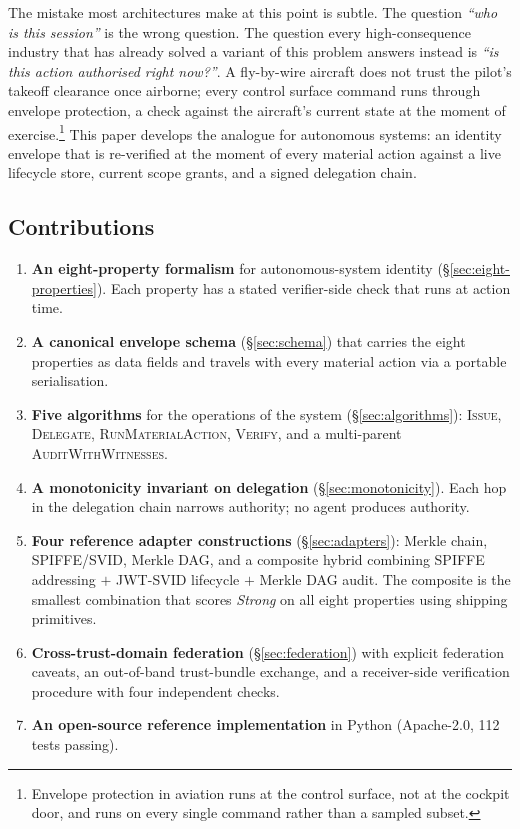 \documentclass[11pt,a4paper]{article}
\begin{document}
The mistake most architectures make at this point is subtle. The question
\emph{``who is this session''} is the wrong question. The question every
high-consequence industry that has already solved a variant of this
problem answers instead is \emph{``is this action authorised right now?''}.
A fly-by-wire aircraft does not trust the pilot's takeoff clearance once
airborne; every control surface command runs through envelope
protection, a check against the aircraft's current state at the moment of
exercise.\footnote{Envelope protection in aviation runs at the control
surface, not at the cockpit door, and runs on every single command rather
than a sampled subset.} This paper develops the analogue for autonomous
systems: an identity envelope that is re-verified at the moment of every
material action against a live lifecycle store, current scope grants,
and a signed delegation chain.

\subsection{Contributions}\label{sec:contributions}

\begin{enumerate}[leftmargin=*,label=\arabic*.]
  \item \textbf{An eight-property formalism} for autonomous-system
    identity (\S\ref{sec:eight-properties}). Each property has a stated
    verifier-side check that runs at action time.
  \item \textbf{A canonical envelope schema} (\S\ref{sec:schema}) that
    carries the eight properties as data fields and travels with every
    material action via a portable serialisation.
  \item \textbf{Five algorithms} for the operations of the system
    (\S\ref{sec:algorithms}): \textsc{Issue},
    \textsc{Delegate}, \textsc{RunMaterialAction}, \textsc{Verify}, and
    a multi-parent \textsc{AuditWithWitnesses}.
  \item \textbf{A monotonicity invariant on delegation}
    (\S\ref{sec:monotonicity}). Each hop in the delegation chain narrows
    authority; no agent produces authority.
  \item \textbf{Four reference adapter constructions} (\S\ref{sec:adapters}):
    Merkle chain, SPIFFE/SVID, Merkle DAG, and a composite hybrid
    combining SPIFFE addressing $+$ JWT-SVID lifecycle $+$ Merkle DAG
    audit. The composite is the smallest combination that scores
    \emph{Strong} on all eight properties using shipping primitives.
  \item \textbf{Cross-trust-domain federation} (\S\ref{sec:federation})
    with explicit federation caveats, an out-of-band trust-bundle
    exchange, and a receiver-side verification procedure with four
    independent checks.
  \item \textbf{An open-source reference implementation} in Python
    (Apache-2.0, 112 tests passing).
\end{enumerate}
\end{document}
